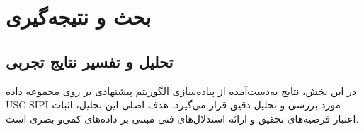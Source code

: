 \documentclass[a4paper,12pt]{report}
\renewcommand{\%}{\lr{\oldpercent}}
\providecommand{\lr}[1]{#1}
\begin{document}
\newpage

\chapter{بحث و نتیجه‌گیری}

\section{تحلیل و تفسیر نتایج تجربی}
در این بخش، نتایج به‌دست‌آمده از پیاده‌سازی الگوریتم پیشنهادی بر روی مجموعه داده \lr{USC-SIPI} مورد بررسی و تحلیل دقیق قرار می‌گیرد. هدف اصلی این تحلیل، اثبات اعتبار فرضیه‌های تحقیق و ارائه استدلال‌های فنی مبتنی بر داده‌های کمی‌و بصری است.
\end{document}
